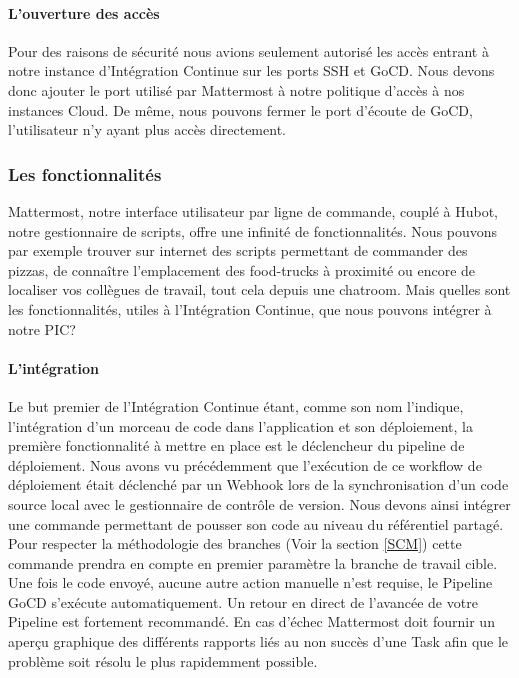           \paragraph{L'ouverture des accès}
          Pour des raisons de sécurité nous avions seulement autorisé les accès entrant à notre instance d'Intégration Continue sur les ports SSH et GoCD. Nous devons donc ajouter le port utilisé par Mattermost à notre politique d'accès à nos instances Cloud. De même, nous pouvons fermer le port d'écoute de GoCD, l'utilisateur n'y ayant plus accès directement.

        \subsubsection{Les fonctionnalités}
        Mattermost, notre interface utilisateur par ligne de commande, couplé à Hubot, notre gestionnaire de scripts, offre une infinité de fonctionnalités. Nous pouvons par exemple trouver sur internet des scripts permettant de commander des pizzas, de connaître l'emplacement des food-trucks à proximité ou encore de localiser vos collègues de travail, tout cela depuis une chatroom. Mais quelles sont les fonctionnalités, utiles à l'Intégration Continue, que nous pouvons intégrer à notre PIC?

          \paragraph{L'intégration} Le but premier de l'Intégration Continue étant, comme son nom l'indique, l'intégration d'un morceau de code dans l'application et son déploiement, la première fonctionnalité à mettre en place est le déclencheur du pipeline de déploiement. Nous avons vu précédemment que l'exécution de ce workflow de déploiement était déclenché par un Webhook lors de la synchronisation d'un code source local avec le gestionnaire de contrôle de version. Nous devons ainsi intégrer une commande permettant de pousser son code au niveau du référentiel partagé. Pour respecter la méthodologie des branches (Voir la section \ref{SCM}) cette commande prendra en compte en premier paramètre la branche de travail cible. Une fois le code envoyé, aucune autre action manuelle n'est requise, le Pipeline GoCD s'exécute automatiquement. Un retour en direct de l'avancée de votre Pipeline est fortement recommandé. En cas d'échec Mattermost doit fournir un aperçu graphique des différents rapports liés au non succès d'une Task afin que le problème soit résolu le plus rapidemment possible.

